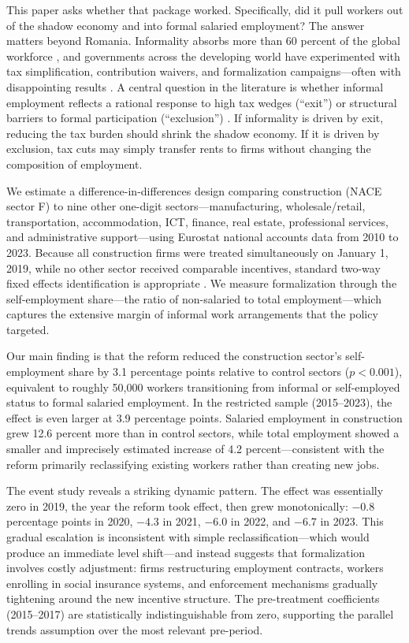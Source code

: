 \documentclass[12pt]{article}
\begin{document}
This paper asks whether that package worked. Specifically, did it pull workers out of the shadow economy and into formal salaried employment? The answer matters beyond Romania. Informality absorbs more than 60 percent of the global workforce \citep{ILO2018women}, and governments across the developing world have experimented with tax simplification, contribution waivers, and formalization campaigns---often with disappointing results \citep{levy2008good, perry2007informality}. A central question in the literature is whether informal employment reflects a rational response to high tax wedges (``exit'') or structural barriers to formal participation (``exclusion'') \citep{la2011role, ulyssea2018firms}. If informality is driven by exit, reducing the tax burden should shrink the shadow economy. If it is driven by exclusion, tax cuts may simply transfer rents to firms without changing the composition of employment.

We estimate a difference-in-differences design comparing construction (NACE sector F) to nine other one-digit sectors---manufacturing, wholesale/retail, transportation, accommodation, ICT, finance, real estate, professional services, and administrative support---using Eurostat national accounts data from 2010 to 2023. Because all construction firms were treated simultaneously on January 1, 2019, while no other sector received comparable incentives, standard two-way fixed effects identification is appropriate \citep{de2020difference, goodman2021difference}. We measure formalization through the self-employment share---the ratio of non-salaried to total employment---which captures the extensive margin of informal work arrangements that the policy targeted.

Our main finding is that the reform reduced the construction sector's self-employment share by 3.1 percentage points relative to control sectors ($p < 0.001$), equivalent to roughly 50,000 workers transitioning from informal or self-employed status to formal salaried employment. In the restricted sample (2015--2023), the effect is even larger at 3.9 percentage points. Salaried employment in construction grew 12.6 percent more than in control sectors, while total employment showed a smaller and imprecisely estimated increase of 4.2 percent---consistent with the reform primarily reclassifying existing workers rather than creating new jobs.

The event study reveals a striking dynamic pattern. The effect was essentially zero in 2019, the year the reform took effect, then grew monotonically: $-0.8$ percentage points in 2020, $-4.3$ in 2021, $-6.0$ in 2022, and $-6.7$ in 2023. This gradual escalation is inconsistent with simple reclassification---which would produce an immediate level shift---and instead suggests that formalization involves costly adjustment: firms restructuring employment contracts, workers enrolling in social insurance systems, and enforcement mechanisms gradually tightening around the new incentive structure. The pre-treatment coefficients (2015--2017) are statistically indistinguishable from zero, supporting the parallel trends assumption over the most relevant pre-period.
\end{document}
